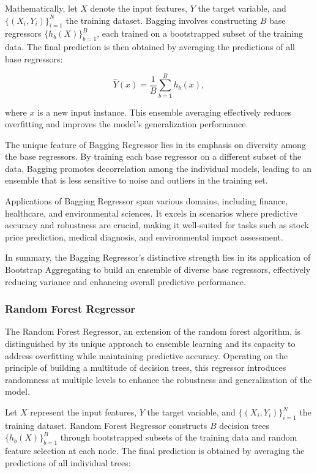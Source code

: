 \documentclass[twocolumn]{article}
\begin{document}
Mathematically, let \(X\) denote the input features, \(Y\) the target variable, and \(\{ (X_i, Y_i) \}_{i=1}^{N}\) the training dataset. Bagging involves constructing \(B\) base regressors \(\{h_b(X)\}_{b=1}^{B}\), each trained on a bootstrapped subset of the training data. The final prediction is then obtained by averaging the predictions of all base regressors:

\[ \hat{Y}(x) = \frac{1}{B} \sum_{b=1}^{B} h_b(x), \]

where \(x\) is a new input instance. This ensemble averaging effectively reduces overfitting and improves the model's generalization performance.

The unique feature of Bagging Regressor lies in its emphasis on diversity among the base regressors. By training each base regressor on a different subset of the data, Bagging promotes decorrelation among the individual models, leading to an ensemble that is less sensitive to noise and outliers in the training set.

Applications of Bagging Regressor span various domains, including finance, healthcare, and environmental sciences. It excels in scenarios where predictive accuracy and robustness are crucial, making it well-suited for tasks such as stock price prediction, medical diagnosis, and environmental impact assessment.

In summary, the Bagging Regressor's distinctive strength lies in its application of Bootstrap Aggregating to build an ensemble of diverse base regressors, effectively reducing variance and enhancing overall predictive performance.
	
		\subsubsection{Random Forest Regressor}
The Random Forest Regressor, an extension of the random forest algorithm, is distinguished by its unique approach to ensemble learning and its capacity to address overfitting while maintaining predictive accuracy. Operating on the principle of building a multitude of decision trees, this regressor introduces randomness at multiple levels to enhance the robustness and generalization of the model.

Let \(X\) represent the input features, \(Y\) the target variable, and \(\{ (X_i, Y_i) \}_{i=1}^{N}\) the training dataset. Random Forest Regressor constructs \(B\) decision trees \(\{h_b(X)\}_{b=1}^{B}\) through bootstrapped subsets of the training data and random feature selection at each node. The final prediction is obtained by averaging the predictions of all individual trees:
\end{document}
